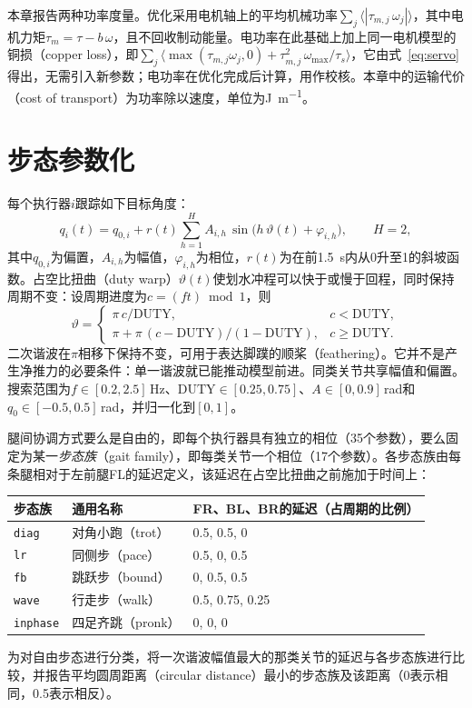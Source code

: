 本章报告两种功率度量。优化采用电机轴上的平均机械功率$\sum_j\langle|\tau_{m,j}\,\omega_j|\rangle$，其中电机力矩$\tau_m=\tau-b\,\omega$，且不回收制动能量。电功率在此基础上加上同一电机模型的铜损（copper loss），即$\sum_j\langle\max(\tau_{m,j}\omega_j,0)+\tau_{m,j}^2\,\omega_\text{max}/\tau_s\rangle$，它由式~\eqref{eq:servo}得出，无需引入新参数；电功率在优化完成后计算，用作校核。本章中的运输代价（cost of transport）为功率除以速度，单位为\si{\joule\per\metre}。

\section{步态参数化}
\label{sec:mj-gait}

每个执行器$i$跟踪如下目标角度：
\begin{equation}
  q_i(t) = q_{0,i} + r(t)\sum_{h=1}^{H} A_{i,h}\,\sin\!\big(h\,\vartheta(t)+\varphi_{i,h}\big), \qquad H=2,
  \label{eq:gait}
\end{equation}
其中$q_{0,i}$为偏置，$A_{i,h}$为幅值，$\varphi_{i,h}$为相位，$r(t)$为在前\SI{1.5}{\second}内从0升至1的斜坡函数。占空比扭曲（duty warp）$\vartheta(t)$使划水冲程可以快于或慢于回程，同时保持周期不变：设周期进度为$c=(ft)\bmod1$，则
\begin{equation}
  \vartheta = \begin{cases}
    \pi\,c/\mathrm{DUTY}, & c<\mathrm{DUTY},\\
    \pi + \pi\,(c-\mathrm{DUTY})/(1-\mathrm{DUTY}), & c\ge\mathrm{DUTY}.
  \end{cases}
  \label{eq:duty-warp}
\end{equation}
二次谐波在$\pi$相移下保持不变，可用于表达脚蹼的顺桨（feathering）。它并不是产生净推力的必要条件：单一谐波就已能推动模型前进。同类关节共享幅值和偏置。搜索范围为$f\in[0.2,2.5]$\,Hz、$\mathrm{DUTY}\in[0.25,0.75]$、$A\in[0,0.9]$\,rad和$q_0\in[-0.5,0.5]$\,rad，并归一化到$[0,1]$。

腿间协调方式要么是自由的，即每个执行器具有独立的相位（35个参数），要么固定为某一\emph{步态族}（gait family），即每类关节一个相位（17个参数）。各步态族由每条腿相对于左前腿FL的延迟定义，该延迟在占空比扭曲之前施加于时间上：
\begin{center}
  \small
  \begin{tabular}{@{}lll@{}}
    \toprule
    步态族 & 通用名称 & FR、BL、BR的延迟（占周期的比例） \\
    \midrule
    \texttt{diag} & 对角小跑（trot） & 0.5, 0.5, 0 \\
    \texttt{lr} & 同侧步（pace） & 0.5, 0, 0.5 \\
    \texttt{fb} & 跳跃步（bound） & 0, 0.5, 0.5 \\
    \texttt{wave} & 行走步（walk） & 0.5, 0.75, 0.25 \\
    \texttt{inphase} & 四足齐跳（pronk） & 0, 0, 0 \\
    \bottomrule
  \end{tabular}
\end{center}
为对自由步态进行分类，将一次谐波幅值最大的那类关节的延迟与各步态族进行比较，并报告平均圆周距离（circular distance）最小的步态族及该距离（0表示相同，0.5表示相反）。

